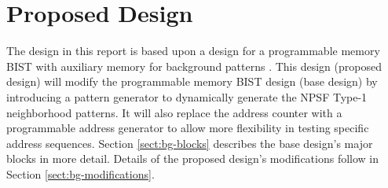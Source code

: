 \chapter{Proposed Design}
\label{chap:design}

The design in this report is based upon a design for a programmable memory BIST with auxiliary memory for background patterns \cite{1584083}.  This design (proposed design) will modify the programmable memory BIST design (base design) by introducing a pattern generator to dynamically generate the NPSF Type-1 neighborhood patterns.  It will also replace the address counter with a programmable address generator to allow more flexibility in testing specific address sequences.  Section \ref{sect:bg-blocks} describes the base design's major blocks in more detail.  Details of the proposed design's modifications follow in Section \ref{sect:bg-modifications}.





